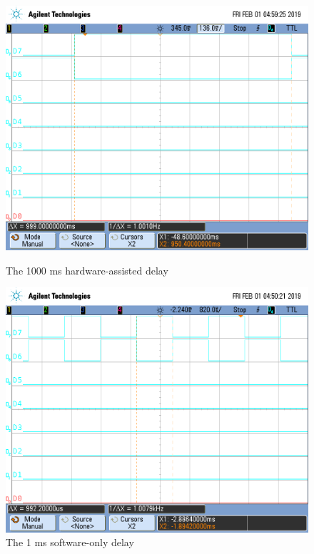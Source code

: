 \documentclass[a4paper, 12pt]{article}
\begin{document}
\begin{figure}[p]
\centering
\includegraphics[width=.8\textwidth]{1000ms_hardware.png}
\caption{The 1000 ms hardware-assisted delay}
\includegraphics[width=.8\textwidth]{1ms_software.png}
\caption{The 1 ms software-only delay}
\end{figure}
\end{document}
